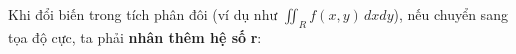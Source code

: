 \documentclass[preview]{standalone}
\begin{document}
\begin{center}
Khi đổi biến trong tích phân đôi (ví dụ như $\iint_R f(x, y) \, dxdy$), nếu chuyển sang tọa độ cực, ta phải \textbf{nhân thêm hệ số}\textbf{ r}:
\end{center}
\end{document}
